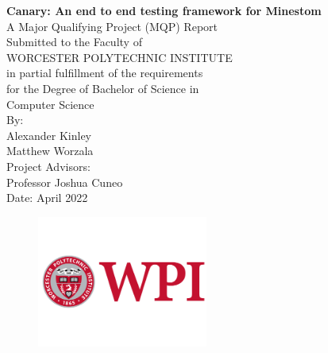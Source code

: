 \documentclass{article}
\begin{document}
 



\begin{center}
    \Huge{\textbf{Canary: An end to end testing framework for Minestom}} \\ %
    \vspace{10mm} %
    \large{
    A Major Qualifying Project (MQP) Report \\
    Submitted to the Faculty of \\
    WORCESTER POLYTECHNIC INSTITUTE \\
    in partial fulfillment of the requirements \\
    for the Degree of Bachelor of Science in \\
    } %
    \Large{
    \vspace{5mm} %
    Computer Science \\ %
    \vspace{10mm} %
    By: \\
    \vspace{2mm} %
    Alexander Kinley \\ %
    Matthew Worzala \\ %
    \vspace {15mm} %
    Project Advisors: \\ %
    \vspace{2mm} %
    Professor Joshua Cuneo \\ %
    \vspace {10mm} %
    Date: April 2022 \\ %
    }
    \vspace{0mm} %
    \begin{figure}[h]
    \centering
    \includegraphics[width=0.5\textwidth]{Images/logo.png} %

\end{figure}
\end{center}
\end{document}
